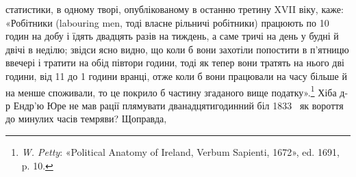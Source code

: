 статистики, в одному творі, опублікованому в останню
третину XVII віку, каже: «Робітники (labouring men, тоді власне
рільничі робітники) працюють по 10 годин на добу і їдять двадцять
разів на тиждень, а саме тричі на день у будні й двічі в неділю;
звідси ясно видно, що коли б вони захотіли попостити в
п’ятницю ввечері і тратити на обід півтори години, тоді як тепер
вони тратять на нього дві години, від 11 до 1 години вранці, отже
коли б вони працювали на  часу більше й на  менше споживали,
то це покрило б  частину згаданого вище податку».\footnote{
\emph{W. Petty}: «Political Anatomy of Ireland, Verbum Sapienti, 1672»,
ed. 1691, p. 10.
}
Хіба д-р Ендр’ю Юре не мав рації плямувати дванадцятигодинний
біл 1833~ як вороття до минулих часів темряви? Щоправда,
\parbreak{}  %
